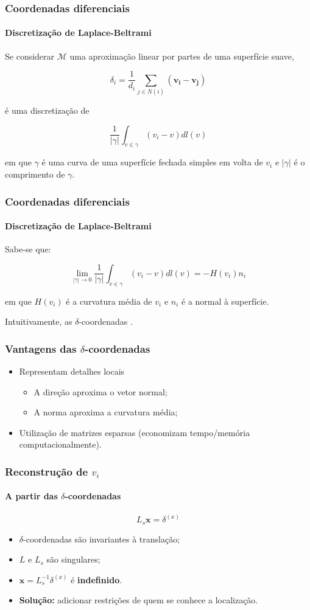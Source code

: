 \begin{frame}
\frametitle{Coordenadas diferenciais}
\framesubtitle{Discretização de Laplace-Beltrami}

Se considerar $\mathcal{M}$ uma aproximação linear por partes de uma superfície suave,

$$\delta_i = \frac{1}{d_i} \sum_{j \in N(i)}(\mathbf{v_i} - \mathbf{v_j})$$

é uma discretização de

$$\frac{1}{|\gamma|} \int_{v \in \gamma} (v_i - v) dl(v)$$

em que $\gamma$ é uma curva de uma superfície fechada simples em volta de $v_i$ e $|\gamma|$ é o comprimento de $\gamma$.

\end{frame}

\begin{frame}
\frametitle{Coordenadas diferenciais}
\framesubtitle{Discretização de Laplace-Beltrami}

Sabe-se que:

$$\lim\limits_{|\gamma|\rightarrow 0} \frac{1}{|\gamma|} \int_{v \in \gamma} (v_i - v) dl(v) = - H(v_i) n_i$$

em que $H(v_i)$ é a curvatura média de $v_i$ e $n_i$ é a normal à superfície.

\medskip

Intuitivamente, as $\delta$-coordenadas .

\end{frame}

\begin{frame}
\frametitle{Vantagens das $\delta$-coordenadas}
	\begin{itemize}
		\item Representam detalhes locais
		\begin{itemize}
			\item A direção aproxima o vetor normal;
			\item A norma aproxima a curvatura média;
		\end{itemize}
		\medskip
		\item Utilização de matrizes esparsas (economizam tempo/memória computacionalmente).
	\end{itemize}
\end{frame}

\begin{frame}
\frametitle{Reconstrução de $v_i$}
\framesubtitle{A partir das $\delta$-coordenadas}

$$L_s \textbf{x} = \delta^{(x)}$$

\begin{itemize}
	\item $\delta$-coordenadas são invariantes à translação;
	\item $L$ e $L_s$ são singulares;
	\item $\textbf{x} = L_s^{-1} \delta^{(x)}$ é \textbf{indefinido}.
	\item \textbf{Solução:} adicionar restrições de quem se conhece a localização.
	
\end{itemize}

\end{frame}


